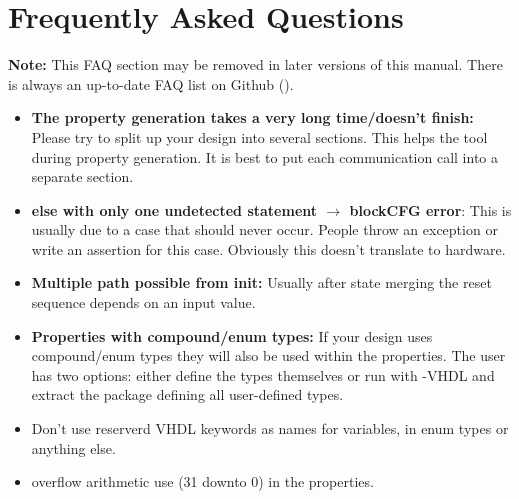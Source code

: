 \section{Frequently Asked Questions}
\label{sec:faq}

\textbf{Note:} %
This FAQ section may be removed in later versions of this manual. %
There is always an up-to-date FAQ list on Github (\cite{web-scam}). %

\begin{itemize}
\item \textbf{The property generation takes a very long time/doesn't
    finish:} Please try to split up your design into several
  sections. %
  This helps the tool during property generation. %
  It is best to put each communication call into a separate section. %

\item \textbf{else with only one undetected statement $\rightarrow$
    blockCFG error}: This is usually due to a case that should never
  occur. %
People throw an exception or write an assertion for this case. %
  Obviously this doesn't translate to hardware. %


\item \textbf{Multiple path possible from init:} Usually after state merging
  the reset sequence depends on an input value. %

\item \textbf{Properties with compound/enum types:} If your design
  uses compound/enum types they will also be used within the
  properties. %
  The user has two options: either define the types themselves or run
  \SCAM{} with -VHDL and extract the package defining all user-defined
  types. %

\item Don't use reserverd VHDL keywords as names for variables, in
  enum types or anything else. %

\item overflow arithmetic use (31 downto 0) in the properties. %

%


\end{itemize}


